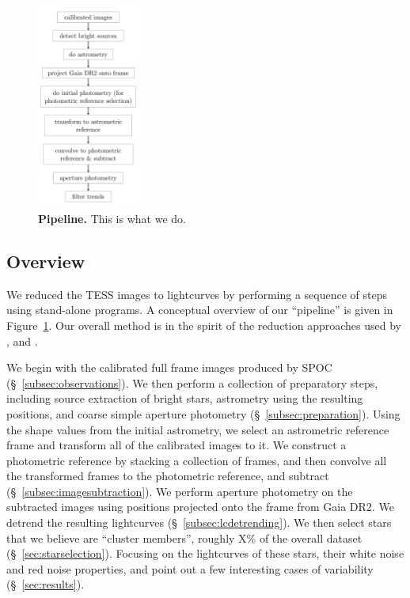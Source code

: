 \documentclass[12pt,twocolumn,tighten]{aastex62}
\begin{document}
\begin{figure}[t]
	\begin{center}
		\leavevmode
		\includegraphics[width=0.3\textwidth]{f2.pdf}
	\end{center}
	\vspace{-0.5cm}
	\caption{
    {\bf Pipeline.} This is what we do.
		\label{fig:pipeline}
	}
\end{figure}

\subsection{Overview}

We reduced the TESS images to lightcurves by performing a sequence of
steps using stand-alone programs.  A conceptual overview of our
``pipeline'' is given in Figure~\ref{fig:pipeline}.  
Our overall method is in the spirit of the reduction approaches used
by \citet{Pal_2009}, \citet{soares-furtado_image_2017} and
\citet{oelkers_precision_2018}.

We begin with the calibrated full frame images produced by SPOC
(\S~\ref{subsec:observations}).  We then perform a collection of
preparatory steps, including source extraction of bright stars,
astrometry using the resulting positions, and coarse simple aperture
photometry (\S~\ref{subsec:preparation}).  Using the shape values from
the initial astrometry, we select an astrometric reference frame and
transform all of the calibrated images to it.  We construct a
photometric reference by stacking a collection of frames, and then
convolve all the transformed frames to the photometric reference,
and subtract (\S~\ref{subsec:imagesubtraction}).  We perform aperture
photometry on the subtracted images using positions projected onto the
frame from Gaia DR2.  We detrend the resulting lightcurves
(\S~\ref{subsec:lcdetrending}).
We then select stars that we believe are ``cluster members'',
roughly X\% of the overall dataset (\S~\ref{sec:starselection}).
Focusing on the lightcurves of these stars, their white noise and red
noise properties, and point out a few interesting cases of
variability (\S~\ref{sec:results}).
\end{document}
